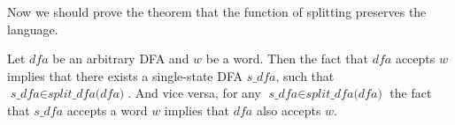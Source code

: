 Now we should prove the theorem that the function of splitting preserves the language.


\begin{theorem}
  Let $\textit{dfa}$ be an arbitrary DFA and $w$ be a word. Then the fact that $\textit{dfa}$ accepts $w$ implies that there exists a single-state DFA $\textit{s\_dfa}$, such that $\textit{s\_dfa} \in \textit{split\_dfa(dfa)}$. And vice versa, for any $\textit{s\_dfa} \in \textit{split\_dfa(dfa)}$ the fact that $\textit{s\_dfa}$ accepts a word $w$ implies that $\textit{dfa}$ also accepts $w$.
\end{theorem}

